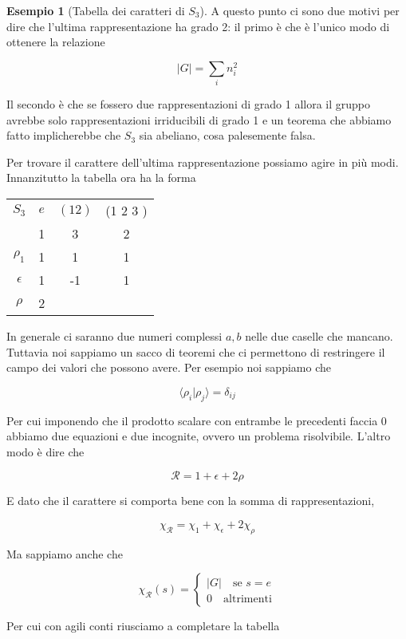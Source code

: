 \documentclass[11pt]{article}
\theoremstyle{plain}
\theoremstyle{definition}
\newtheorem{exmp}{Esempio}[section]
\theoremstyle{remark}
\newcommand{\dsum}{\displaystyle\sum}
\begin{document}
\begin{exmp}[Tabella dei caratteri di $S_3$]
A questo punto ci sono due motivi per dire che l'ultima rappresentazione ha grado 2: il primo è che è l'unico modo di ottenere la relazione

\[ |G | = \dsum_i n_i^2 \]

Il secondo è che se fossero due rappresentazioni di grado 1 allora il gruppo avrebbe solo rappresentazioni irriducibili di grado 1 e un teorema che abbiamo fatto implicherebbe che $S_3$ sia abeliano, cosa palesemente falsa.

Per trovare il carattere dell'ultima rappresentazione possiamo agire in più modi. Innanzitutto la tabella ora ha la forma




\begin{table}[!ht]
\centering
\begin{tabular}{|c|c|c|c|}
\hline
$S_3$  & $e$ & $(1 2)$ & (1 2 3 )    \\
 & 1 & 3 & 2 \\
\hline
 $\rho_1$ & 1 & 1  & 1 \\
\hline
$\epsilon$ & 1 & -1 & 1 \\
\hline
$\rho$ & 2 &  & \\
\hline
\end{tabular}
\end{table}


In generale ci saranno due numeri complessi $a, b$ nelle due caselle che mancano. Tuttavia noi sappiamo un sacco di teoremi che ci permettono di restringere il campo dei valori che possono avere. Per esempio noi sappiamo che

\[\langle \rho_i | \rho_j \rangle = \delta_{ij}\]

Per cui imponendo che il prodotto scalare con entrambe le precedenti faccia 0 abbiamo due equazioni e due incognite, ovvero un problema risolvibile. L'altro modo è dire che

\[ \mathcal{R} = 1 + \epsilon + 2\rho\]

E dato che il carattere si comporta bene con la somma di rappresentazioni,

\[\chi_{\mathcal{R}} = \chi_1 + \chi_\epsilon + 2 \chi_\rho  \]

Ma sappiamo anche che

\[ \chi_{\mathcal{R}}(s) =
\begin{cases}
|G| \quad \text{se } s = e \\
0 \quad \text{altrimenti}
\end{cases}\]

Per cui con agili conti riusciamo a completare la tabella









\end{exmp}
\end{document}
